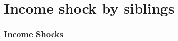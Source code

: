 \documentclass{beamer}
\begin{document}
\section{Income shock by siblings}


\begin{frame}
    \label{frame:incomeshocks_siblings}
    \frametitle{Income Shocks}
     

     {
    }

 \begin{flushleft}
        \hyperlink{frame:incomeshocks}{}
    \end{flushleft}   
    
    
\end{frame}

%
\end{document}
